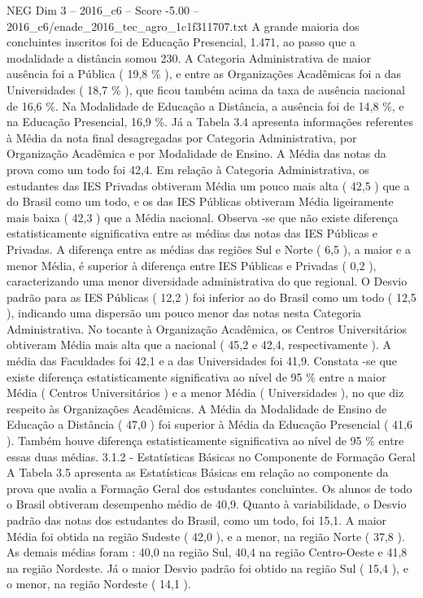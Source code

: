 \begin{textsample}{NEG Dim 3 – 2016\_c6 – Score -5.00 – 2016\_c6/enade\_2016\_tec\_agro\_1c1f311707.txt}
A grande maioria dos concluintes inscritos foi de Educação Presencial, 1.471, ao passo que a modalidade a distância somou 230.
A Categoria Administrativa de maior ausência foi a Pública ( 19,8 \% ), e entre as Organizações Acadêmicas foi a das Universidades ( 18,7 \% ), que ficou também acima da taxa de ausência nacional de 16,6 \%.
Na Modalidade de Educação a Distância, a ausência foi de 14,8 \%, e na Educação Presencial, 16,9 \%.
Já a Tabela 3.4 apresenta informações referentes à Média da nota final desagregadas por Categoria Administrativa, por Organização Acadêmica e por Modalidade de Ensino.
A Média das notas da prova como um todo foi 42,4.
Em relação à Categoria Administrativa, os estudantes das IES Privadas obtiveram Média um pouco mais alta ( 42,5 ) que a do Brasil como um todo, e os das IES Públicas obtiveram Média ligeiramente mais baixa ( 42,3 ) que a Média nacional.
Observa -se que não existe diferença estatisticamente significativa entre as médias das notas das IES Públicas e Privadas.
A diferença entre as médias das regiões Sul e Norte ( 6,5 ), a maior e a menor Média, é superior à diferença entre IES Públicas e Privadas ( 0,2 ), caracterizando uma menor diversidade administrativa do que regional.
O Desvio padrão para as IES Públicas ( 12,2 ) foi inferior ao do Brasil como um todo ( 12,5 ), indicando uma dispersão um pouco menor das notas nesta Categoria Administrativa.
No tocante à Organização Acadêmica, os Centros Universitários obtiveram Média mais alta que a nacional ( 45,2 e 42,4, respectivamente ).
A média das Faculdades foi 42,1 e a das Universidades foi 41,9.
Constata -se que existe diferença estatisticamente significativa ao nível de 95 \% entre a maior Média ( Centros Universitários ) e a menor Média ( Universidades ), no que diz respeito às Organizações Acadêmicas.
A Média da Modalidade de Ensino de Educação a Distância ( 47,0 ) foi superior à Média da Educação Presencial ( 41,6 ).
Também houve diferença estatisticamente significativa ao nível de 95 \% entre essas duas médias. 3.1.2 - Estatísticas Básicas no Componente de Formação Geral A Tabela 3.5 apresenta as Estatísticas Básicas em relação ao componente da prova que avalia a Formação Geral dos estudantes concluintes.
Os alunos de todo o Brasil obtiveram desempenho médio de 40,9.
Quanto à variabilidade, o Desvio padrão das notas dos estudantes do Brasil, como um todo, foi 15,1.
A maior Média foi obtida na região Sudeste ( 42,0 ), e a menor, na região Norte ( 37,8 ).
As demais médias foram : 40,0 na região Sul, 40,4 na região Centro-Oeste e 41,8 na região Nordeste.
Já o maior Desvio padrão foi obtido na região Sul ( 15,4 ), e o menor, na região Nordeste ( 14,1 ).

\end{textsample}
